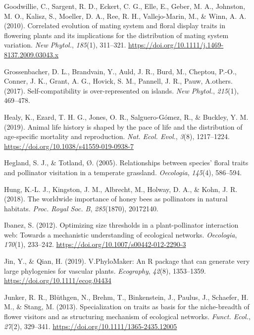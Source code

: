 \documentclass[
  12pt,
  a4paper,
]{article}
\newlength{\cslhangindent}
\newlength{\cslentryspacingunit} %
\newenvironment{CSLReferences}[2] %
 {%
  \setlength{\parindent}{0pt}
  \ifodd #1
  \let\oldpar\par
  \def\par{\hangindent=\cslhangindent\oldpar}
  \fi
  \setlength{\parskip}{#2\cslentryspacingunit}
 }%
 {}
\begin{document}
\begin{CSLReferences}{1}{0}
\leavevmode{}%
Goodwillie, C., Sargent, R. D., Eckert, C. G., Elle, E., Geber, M. A., Johnston, M. O., Kalisz, S., Moeller, D. A., Ree, R. H., Vallejo-Marin, M., \& Winn, A. A. (2010). Correlated evolution of mating system and floral display traits in flowering plants and its implications for the distribution of mating system variation. \emph{New Phytol.}, \emph{185}(1), 311--321. \url{https://doi.org/10.1111/j.1469-8137.2009.03043.x}

\leavevmode{}%
Grossenbacher, D. L., Brandvain, Y., Auld, J. R., Burd, M., Cheptou, P.-O., Conner, J. K., Grant, A. G., Hovick, S. M., Pannell, J. R., Pauw, A.others. (2017). Self-compatibility is over-represented on islands. \emph{New Phytol.}, \emph{215}(1), 469--478.

\leavevmode{}%
Healy, K., Ezard, T. H. G., Jones, O. R., Salguero-Gómez, R., \& Buckley, Y. M. (2019). Animal life history is shaped by the pace of life and the distribution of age-specific mortality and reproduction. \emph{Nat. Ecol. Evol.}, \emph{3}(8), 1217--1224. \url{https://doi.org/10.1038/s41559-019-0938-7}

\leavevmode{}%
Hegland, S. J., \& Totland, Ø. (2005). Relationships between species' floral traits and pollinator visitation in a temperate grassland. \emph{Oecologia}, \emph{145}(4), 586--594.

\leavevmode{}%
Hung, K.-L. J., Kingston, J. M., Albrecht, M., Holway, D. A., \& Kohn, J. R. (2018). The worldwide importance of honey bees as pollinators in natural habitats. \emph{Proc. Royal Soc. B}, \emph{285}(1870), 20172140.

\leavevmode{}%
Ibanez, S. (2012). Optimizing size thresholds in a plant-pollinator interaction web: Towards a mechanistic understanding of ecological networks. \emph{Oecologia}, \emph{170}(1), 233--242. \url{https://doi.org/10.1007/s00442-012-2290-3}

\leavevmode{}%
Jin, Y., \& Qian, H. (2019). V.{PhyloMaker}: An {R} package that can generate very large phylogenies for vascular plants. \emph{Ecography}, \emph{42}(8), 1353--1359. \url{https://doi.org/10.1111/ecog.04434}

\leavevmode{}%
Junker, R. R., Blüthgen, N., Brehm, T., Binkenstein, J., Paulus, J., Schaefer, H. M., \& Stang, M. (2013). Specialization on traits as basis for the niche-breadth of flower visitors and as structuring mechanism of ecological networks. \emph{Funct. Ecol.}, \emph{27}(2), 329--341. \url{https://doi.org/10.1111/1365-2435.12005}


\end{CSLReferences}
\end{document}
